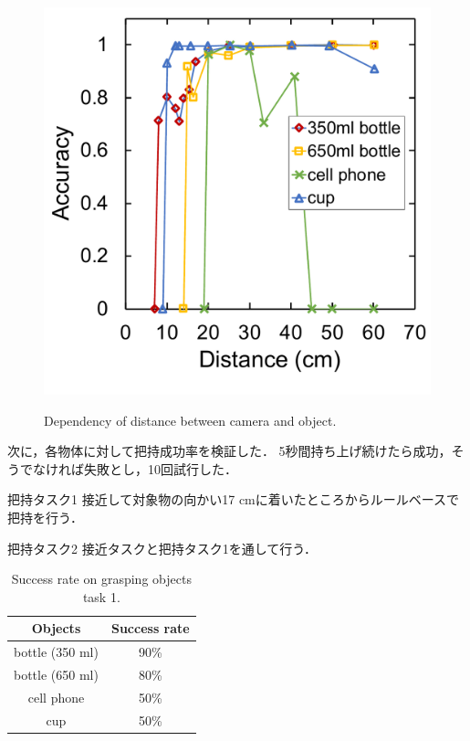 \begin{figure}[H]
\begin{minipage}{0.45\columnwidth}
        \includegraphics[width=0.95\linewidth]{figure/chapter4/mrcnn_depth_padding}
        \label{fig:mrcnn距離パディング}
    \end{minipage}
    \caption{Dependency of distance between camera and object.}
    \label{fig:mrcnn距離}
\end{figure}


次に，各物体に対して把持成功率を検証した．
5秒間持ち上げ続けたら成功，そうでなければ失敗とし，10回試行した．

把持タスク1
接近して対象物の向かい17 cmに着いたところからルールベースで把持を行う．

把持タスク2
接近タスクと把持タスク1を通して行う．

\begin{table}[H]
    \centering
    \caption{Success rate on grasping objects task 1.}
    \begin{tabular}{cc}\toprule
        Objects & Success rate \\ \midrule
        bottle (350 ml) & 90\% \\
        bottle (650 ml) & 80\% \\
        cell phone & 50\% \\ 
        cup & 50\% \\ \bottomrule
    \end{tabular} 
    \label{tab:把持成功率1}
\end{table}

